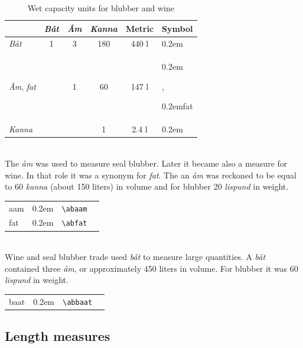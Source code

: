 \documentclass[a4paper]{article}
\newcommand{\samplefont}{\fontsize{16}{16}\abcursivefamily\spaceskip0.2em}
\newcommand{\sample}[1]{{\samplefont #1 \strut}}
\newcommand{\ltxncmd}[1]{\texttt{\textbackslash{}#1}}
\begin{document}
\begin{description}
\begin{table}
  \centering
  \begin{tabular}{lccc|cl}
    &  \emph{Båt} & \emph{Åm} & \emph{Kanna} & Metric &
    Symbol \\
    \hline
    \emph{Båt}   & 1 & 3 & 180 & 440 l & \sample{\abbaat} \\
    \emph{Åm}, \emph{fat}    &   & 1 &  60 & 147 l & \sample{\abaam}, \sample{fat}  \\
    \emph{Kanna} &   &   &   1 & 2.4 l & \sample{\abkanna} \\
  \end{tabular}
  \caption{Wet capacity units for blubber and wine}
  \label{tab_large_wet_b}
\end{table}


\item [\sample{\abaam}, \sample{fat} \emph{åm}, \emph{aami}] \mbox{} \\
  The \emph{åm} was used to measure seal blubber. Later it became also
  a measure for wine. In that role it was a synonym for \emph{fat}.
  The an \emph{åm} was reckoned to be equal to 60 \emph{kanna} (about
  150 liters) in volume  and for blubber  20 \emph{lispund} in weight.
  \begin{center}
    \begin{tabular}{llll}
      {}aam & \sample{\abaam} & \ltxncmd{abaam} \\
      {}fat & \sample{\abfat} & \ltxncmd{abfat} \\
    \end{tabular}
  \end{center}



\item [\sample{\abbaat} \emph{båt}] \mbox{} \\
  Wine and seal blubber trade used \emph{båt} to measure large
  quantities. A \emph{båt} contained three \emph{åm}, or approximately
  450 liters in volume. For blubber it was 60 \emph{lispund} in
  weight.
  \begin{center}
    \begin{tabular}{llll}
      {}baat & \sample{\abbaat} & \ltxncmd{abbaat} \\
    \end{tabular}
  \end{center}

\end{description}


\subsection{Length measures}
\end{document}
